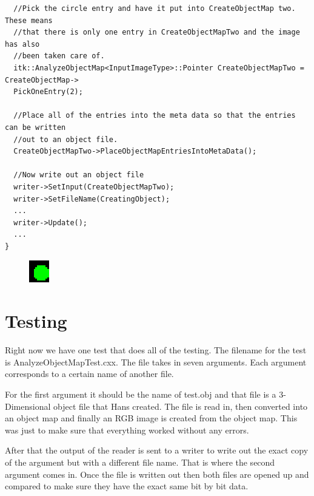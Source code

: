 \documentclass{InsightArticle}
\begin{document}
\begin{itemize}
\begin{verbatim}
  //Pick the circle entry and have it put into CreateObjectMap two.  These means
  //that there is only one entry in CreateObjectMapTwo and the image has also
  //been taken care of.
  itk::AnalyzeObjectMap<InputImageType>::Pointer CreateObjectMapTwo = CreateObjectMap->
  PickOneEntry(2);
  
  //Place all of the entries into the meta data so that the entries can be written
  //out to an object file.
  CreateObjectMapTwo->PlaceObjectMapEntriesIntoMetaData();
  
  //Now write out an object file
  writer->SetInput(CreateObjectMapTwo);
  writer->SetFileName(CreatingObject);
  ...
  writer->Update();
  ...
}
\end{verbatim} \normalsize

\begin{figure}[h]
\center
\includegraphics[width=.14\textwidth]{circle.eps}
\label{fig:StreamingConceptDiagram}
\end{figure}

\end{itemize}

\section{Testing}

Right now we have one test that does all of the testing.  The filename for the test is AnalyzeObjectMapTest.cxx.  The file takes in seven arguments.
Each argument corresponds to a certain name of another file.  

For the first argument it should be the name of test.obj and that file is a 3-Dimensional object file that Hans created.  The file is read in, then converted into an object map and finally an RGB image is created from the object map.  This was just to make sure that everything worked without any errors.  

After that the output of the reader is sent to a writer to write out the exact copy of the argument but with a different file name.  That is where the second argument comes in.  Once the file is written out then both files are opened up and compared to make sure they have the exact same bit by bit data.  
\end{document}
